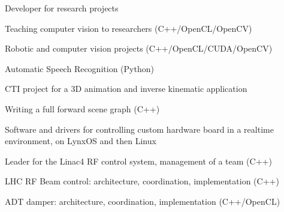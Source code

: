 \documentclass[a4paper]{deedy-resume} %
\begin{document}
\begin{minipage}[t]{0.66\textwidth}
\sectionspace %


	Developer for research projects
	\begin{tightitemize}
		\item Teaching computer vision to researchers (C++/OpenCL/OpenCV)
		\item Robotic and computer vision projects (C++/OpenCL/CUDA/OpenCV)
		\item Automatic Speech Recognition (Python)
	\end{tightitemize}

\sectionspace %


	CTI project for a 3D animation and inverse kinematic application
	\begin{tightitemize}
		\item Writing a full forward scene graph (C++)
	\end{tightitemize}

\sectionspace %


	Software and drivers for controlling custom hardware board in a realtime
    environment, on LynxOS and then Linux
	\begin{tightitemize}
		\item Leader for the Linac4 RF control system, management of a team (C++)
		\item LHC RF Beam control: architecture, coordination, implementation (C++)
		\item ADT damper: architecture, coordination, implementation (C++/OpenCL)
	\end{tightitemize}

\sectionspace %



\end{minipage}
\end{document}

